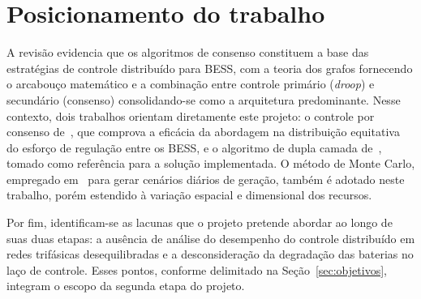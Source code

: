 \section{Posicionamento do trabalho}
\label{sec:posicionamento}

A revisão evidencia que os algoritmos de consenso constituem a base das estratégias de controle 
distribuído para BESS, com a teoria dos grafos fornecendo o arcabouço matemático e a combinação entre 
controle primário (\emph{droop}) e secundário (consenso) consolidando-se como a arquitetura predominante. 
Nesse contexto, dois trabalhos orientam diretamente este projeto: o controle por consenso 
de~\cite{xing2022}, que comprova a eficácia da abordagem na distribuição equitativa do esforço de 
regulação entre os BESS, e o algoritmo de dupla camada de~\cite{paradacontzen2024}, tomado como 
referência para a solução implementada. O método de Monte Carlo, empregado em~\cite{emarati2021} para 
gerar cenários diários de geração, também é adotado neste trabalho, porém estendido à variação espacial 
e dimensional dos recursos.

Por fim, identificam-se as lacunas que o projeto pretende abordar ao longo de suas duas etapas: a 
ausência de análise do desempenho do controle distribuído em redes trifásicas desequilibradas e a 
desconsideração da degradação das baterias no laço de controle. Esses pontos, conforme delimitado na 
Seção~\ref{sec:objetivos}, integram o escopo da segunda etapa do projeto.
